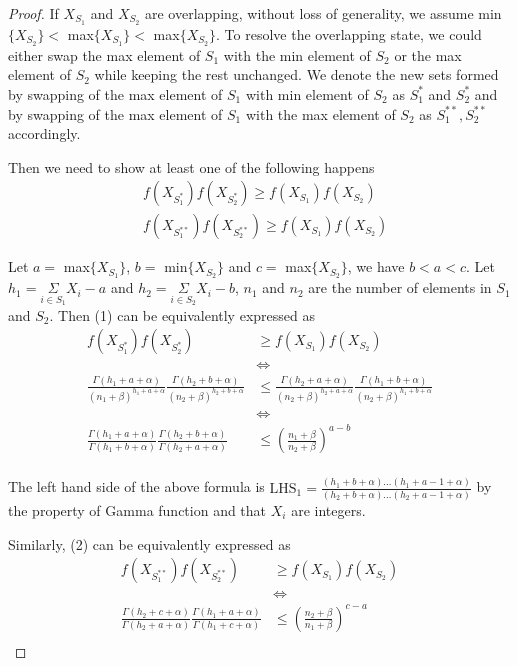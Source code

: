 \documentclass[aoas,preprint]{imsart}
\begin{document}
\begin{proof}
If $X_{S_1}$ and $X_{S_2}$ are overlapping, without loss of generality, we assume min$\{X_{S_2}\}  <$ max$\{X_{S_1}\}  <$ max$\{X_{S_2}\}$. To resolve the overlapping state, we could either
swap the max element of $S_1$ with the min element of $S_2$ or the max element of $S_2$ while keeping the rest unchanged. We denote the new sets formed 
by swapping of the max element of $S_1$ with min element of $S_2$ as $S_1^*$ and $S_2^*$ and by swapping of the max element of $S_1$ with the max element of $S_2$ as $S_1^{**}, S_2^{**}$ accordingly.

Then we need to show  at least one of the following happens
\begin{align}
&f(X_{S_1^*}) f(X_{S_2^*}) \geq f(X_{S_1}) f(X_{S_2})\\
&f(X_{S_1^{**}}) f(X_{S_2^{**}}) \geq f(X_{S_1}) f(X_{S_2})
\end{align}


Let $a =$ max$\{X_{S_1}\}$, $b = $ min$\{X_{S_2}\}$ and $c = $ max$\{X_{S_2}\}$, we have $b < a < c$. Let $h_1 = \underset{i \in S_1}{\Sigma} X_i - a$ and $h_2 = \underset{i \in S_2}{\Sigma} X_i - b$, $n_1$ and $n_2$ are the number of elements in $S_1$ and $S_2$. Then (1) can be equivalently expressed as 
\begin{align*}
f(X_{S_1^*}) f(X_{S_2^*}) &\geq f(X_{S_1}) f(X_{S_2})\\
&\iff\\
\frac{\Gamma(h_1 + a + \alpha)}{(n_1 + \beta)^{h_1 + a +\alpha}} \frac{\Gamma(h_2 + b + \alpha)}{(n_2 + \beta)^{h_2 + b + \alpha}} &\leq \frac{\Gamma(h_2 + a + \alpha)}{(n_2 + \beta)^{h_2+ a +\alpha}} \frac{\Gamma(h_1 + b + \alpha)}{(n_2 + \beta)^{h_1 + b + \alpha}}\\
&\iff\\
\frac{\Gamma(h_1 + a + \alpha)}{\Gamma(h_1 + b + \alpha)} \frac{\Gamma(h_2 + b + \alpha)}{\Gamma(h_2 + a + \alpha)} &\leq (\frac{n_1 + \beta}{n_2 + \beta})^{a - b} \\
\end{align*}

The left hand side of the above formula is $\text{LHS}_1 = \frac{(h_1 + b + \alpha)...(h_1 + a - 1 + \alpha)}{(h_2 + b + \alpha) ... (h_2 + a - 1 + \alpha)}$ by the property of Gamma function and that 
 $X_i$ are integers.

Similarly, (2) can be equivalently expressed as 
\begin{align*}
f(X_{S_1^{**}}) f(X_{S_2^{**}}) &\geq f(X_{S_1}) f(X_{S_2})\\
&\iff\\
\frac{\Gamma(h_2 + c + \alpha)}{\Gamma(h_2 + a + \alpha)} \frac{\Gamma(h_1 + a + \alpha)}{\Gamma(h_1 + c + \alpha)} &\leq (\frac{n_2 + \beta}{n_1 + \beta})^{c - a} \\
\end{align*}


\end{proof}
\end{document}
